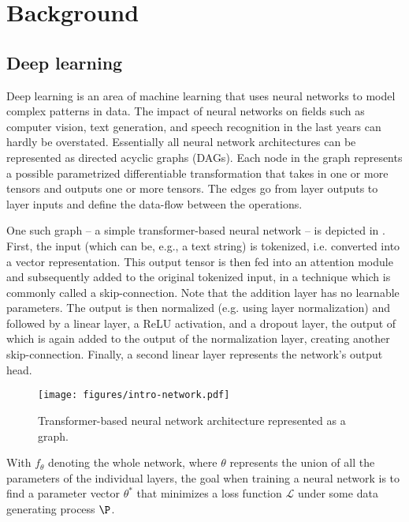 \documentclass[article]{jss}
\theoremstyle{definition}
\begin{document}
\section{Background}\label{sec:background}


\subsection{Deep learning}\label{sec:background_dl}

Deep learning is an area of machine learning that uses neural networks to model complex patterns in data.
The impact of neural networks on fields such as computer vision, text generation, and speech recognition in the last years can hardly be overstated.
Essentially all neural network architectures can be represented as directed acyclic graphs (DAGs).
Each node in the graph represents a possible parametrized differentiable transformation that takes in one or more tensors and outputs one or more tensors.
The edges go from layer outputs to layer inputs and define the data-flow between the operations.

One such graph -- a simple transformer-based neural network -- is depicted in .
First, the input (which can be, e.g., a text string) is tokenized, i.e. converted into a vector representation.
This output tensor is then fed into an attention module and subsequently added to the original tokenized input, in a technique which is commonly called a skip-connection.
Note that the addition layer has no learnable parameters.
The output is then normalized (e.g. using layer normalization) and followed by a linear layer, a ReLU activation, and a dropout layer, the output of which is again added to the output of the normalization layer, creating another skip-connection.
Finally, a second linear layer represents the network's output head.

\begin{figure}[h]
    \centering
    \texttt{[image: figures/intro-network.pdf]}
    \caption{Transformer-based neural network architecture represented as a graph.}
    \label{fig:intro-network}
\end{figure}

With $f_\theta$ denoting the whole network, where $\theta$ represents the union of all the parameters of the individual layers, the goal when training a neural network is to find a parameter vector $\theta^*$ that minimizes a loss function $\mathcal{L}$ under some data generating process $\P$.
\end{document}
